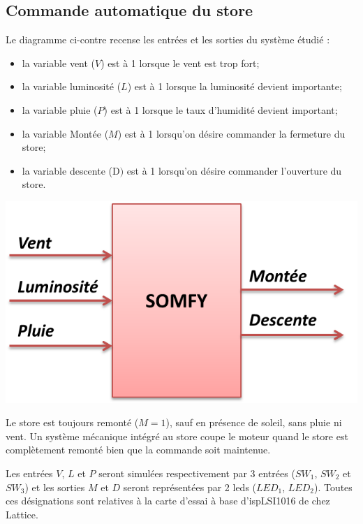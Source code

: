 \documentclass[10pt]{article}
\begin{document}
\subsection{Commande automatique du store}

\begin{minipage}[c]{.48\linewidth}
Le diagramme ci-contre recense les entrées et les sorties du système étudié :
\begin{itemize}
\item la variable vent ($V$) est à 1 lorsque le vent est trop fort;
\item la variable luminosité ($L$) est à 1 lorsque la luminosité devient importante;
\item la variable pluie ($P$) est à 1 lorsque le taux d’humidité devient important;
\item la variable Montée ($M$) est à 1 lorsqu’on désire commander la fermeture du store;
\item la variable descente (D$)$ est à 1 lorsqu’on désire commander l’ouverture du store. 
\end{itemize}
\end{minipage} \hfill
\begin{minipage}[c]{.48\linewidth}
\begin{center}
\includegraphics[width=.95\textwidth]{images/ES}
\end{center}
\end{minipage} 
Le store est toujours remonté ($M=1$), sauf en présence de soleil, sans pluie ni vent. Un système mécanique intégré au store coupe le moteur quand le store est complètement remonté bien que la commande soit maintenue.

Les entrées $V$, $L$ et $P$ seront simulées respectivement par 3 entrées ($SW_1$, $SW_2$ et $SW_3$) et les sorties $M$ et $D$ seront représentées par 2 leds ($LED_1$, $LED_2$). Toutes ces désignations sont relatives à la carte d’essai à base d’ispLSI1016 de chez Lattice.
\end{document}
